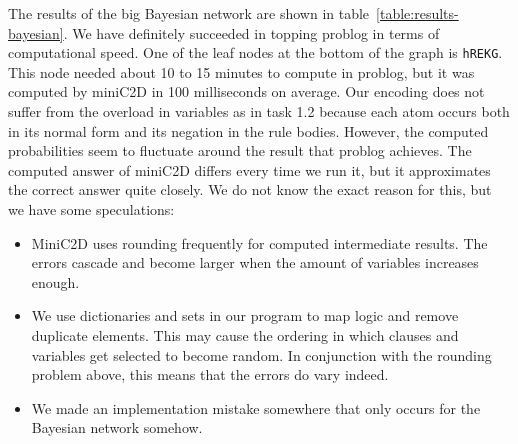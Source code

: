 The results of the big Bayesian network are shown in table~\ref{table:results-bayesian}. We have definitely succeeded in topping problog in terms of computational speed. One of the leaf nodes at the bottom of the graph is \texttt{hREKG}. This node needed about 10 to 15 minutes to compute in problog, but it was computed by miniC2D in 100 milliseconds on average. Our encoding does not suffer from the overload in variables as in task 1.2 because each atom occurs both in its normal form and its negation in the rule bodies. However, the computed probabilities seem to fluctuate around the result that problog achieves. The computed answer of miniC2D differs every time we run it, but it approximates the correct answer quite closely. We do not know the exact reason for this, but we have some speculations:
\begin{itemize}
\item MiniC2D uses rounding frequently for computed intermediate results. The errors cascade and become larger when the amount of variables increases enough.
\item We use dictionaries and sets in our program to map logic and remove duplicate elements. This may cause the ordering in which clauses and variables get selected to become random. In conjunction with the rounding problem above, this means that the errors do vary indeed.
\item We made an implementation mistake somewhere that only occurs for the Bayesian network somehow.
\end{itemize}

